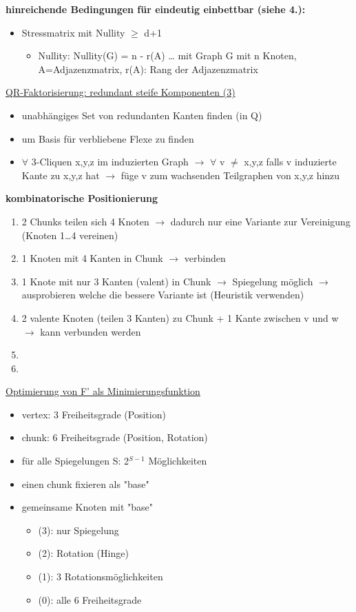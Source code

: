 \documentclass[12pt,a4paper]{article}
\begin{document}
\textbf{hinreichende Bedingungen für eindeutig einbettbar (siehe 4.):}
\begin{itemize}
	\item Stressmatrix mit Nullity $\geq$ d+1
	\begin{itemize}
		\item Nullity: Nullity(G) = n - r(A) … mit Graph G mit n Knoten, A=Adjazenzmatrix, r(A): Rang der Adjazenzmatrix
	\end{itemize}
\end{itemize}

\parbox{\linewidth}{
\underline{QR-Faktorisierung: redundant steife Komponenten (3)}\\
\begin{itemize}
	\item unabhängiges Set von redundanten Kanten finden (in Q)
	\item um Basis für verbliebene Flexe zu finden
	\item $\forall$ 3-Cliquen x,y,z im induzierten Graph $\rightarrow$ $\forall$ v $\neq$ x,y,z falls v induzierte Kante zu x,y,z hat $\rightarrow$ füge v zum wachsenden Teilgraphen von x,y,z hinzu
\end{itemize}
}

\parbox{\linewidth}{
\textbf{kombinatorische Positionierung}
\begin{enumerate}
	\item 2 Chunks teilen sich 4 Knoten $\rightarrow$ dadurch nur eine Variante zur Vereinigung (Knoten 1…4 vereinen)
	\item 1 Knoten mit 4 Kanten in Chunk $\rightarrow$ verbinden
	\item 1 Knote mit nur 3 Kanten (valent) in Chunk $\rightarrow$ Spiegelung möglich $\rightarrow$ ausprobieren welche die bessere Variante ist (Heuristik verwenden)
	\item 2 valente Knoten (teilen 3 Kanten) zu Chunk + 1 Kante zwischen v und w $\rightarrow$ kann verbunden werden
	\item 
	\item
\end{enumerate}
}

\underline{Optimierung von F' als Minimierungsfunktion}
\begin{itemize}
	\item vertex: 3 Freiheitsgrade (Position)
	\item chunk: 6 Freiheitsgrade (Position, Rotation)
	\item für alle Spiegelungen S: 2$^{S-1}$ Möglichkeiten
	\item einen chunk fixieren als "base"
	\item gemeinsame Knoten mit "base"
	\begin{itemize}
		\item (3): nur Spiegelung
		\item (2): Rotation (Hinge)
		\item (1): 3 Rotationsmöglichkeiten
		\item (0): alle 6 Freiheitsgrade
	\end{itemize}
\end{itemize}
\end{document}
